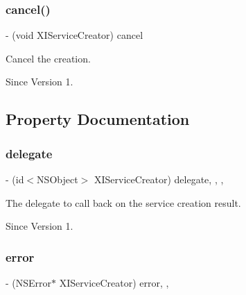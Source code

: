 \subsubsection{\texorpdfstring{cancel()}{cancel()}}
{\footnotesize\ttfamily -\/ (void X\+I\+Service\+Creator) cancel \begin{DoxyParamCaption}{ }\end{DoxyParamCaption}}



Cancel the creation. 

\begin{DoxySince}{Since}
Version 1. 
\end{DoxySince}


\subsection{Property Documentation}
\hypertarget{protocol_x_i_service_creator_01-p_a60e9b426925df3fb4ac7d74e23a28cbb}{}\label{protocol_x_i_service_creator_01-p_a60e9b426925df3fb4ac7d74e23a28cbb} 
\subsubsection{\texorpdfstring{delegate}{delegate}}
{\footnotesize\ttfamily -\/ (id$<$N\+S\+Object$>$ X\+I\+Service\+Creator) delegate\hspace{0.3cm}{\ttfamily [read]}, {\ttfamily [write]}, {\ttfamily [nonatomic]}, {\ttfamily [weak]}}



The delegate to call back on the service creation result. 

\begin{DoxySince}{Since}
Version 1. 
\end{DoxySince}
\hypertarget{protocol_x_i_service_creator_01-p_a972777a7cea43ed9f2a5dacf8361e73f}{}\label{protocol_x_i_service_creator_01-p_a972777a7cea43ed9f2a5dacf8361e73f} 
\subsubsection{\texorpdfstring{error}{error}}
{\footnotesize\ttfamily -\/ (N\+S\+Error$\ast$ X\+I\+Service\+Creator) error\hspace{0.3cm}{\ttfamily [read]}, {\ttfamily [nonatomic]}, {\ttfamily [assign]}}




